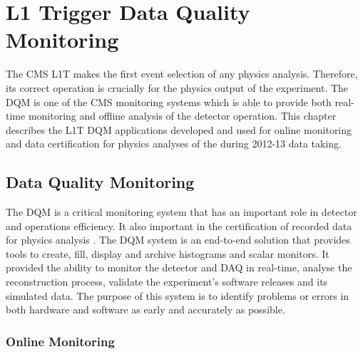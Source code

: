 \chapter{L1 Trigger Data Quality Monitoring}
\label{CHAPTER:TechnicalWork}



The \gls{CMS} \gls{L1T} makes the first event selection of any physics analysis. Therefore, its correct operation is crucially for the physics output of the experiment. The \gls{DQM} is one of the \gls{CMS} monitoring systems which is able to provide both real-time monitoring and offline analysis of the detector operation. This chapter describes the \gls{L1T} \gls{DQM} applications developed and used for online monitoring and data certification for physics analyses of the during 2012-13 data taking.

\section{Data Quality Monitoring}
\label{SECTION:TechnicalWork_DataQualityMonitoring}


The \gls{DQM} is a critical monitoring system that has an important role in detector and operations efficiency. It also important in the certification of recorded data for physics analysis \cite{CMSTDR:CMSTridasTDRVol1,ARTICLE:CMSDataQualityMonitoringSoftWare_ExperienceAndFuture}. The \gls{DQM} system is an end-to-end solution that provides tools to create, fill, display and archive histograms and scalar monitors. It provided the ability to monitor the detector and \gls{DAQ} in real-time, analyse the reconstruction process, validate the experiment's software releases and its simulated data. The purpose of this system is to identify problems or errors in both hardware and software as early and accurately as possible.

\subsection{Online Monitoring}
\label{SECTION:TechnicalWork_DataQualityMonitoring_OnlineMonitoring}

